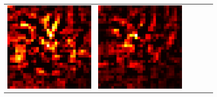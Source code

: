 \documentclass[preprint,12pt]{elsarticle}
\begin{document}
\begin{figure}[p]
\begin{tabular}{cccccc}
  \includegraphics[scale=\scale]{../visualizations/examples/cifar10/cnn/positive_saliency_map/0.png} & 
  \includegraphics[scale=\scale]{../visualizations/examples/cifar10/cnn/negative_saliency_map/0.png} & 

\end{tabular}
\end{figure}
\end{document}
